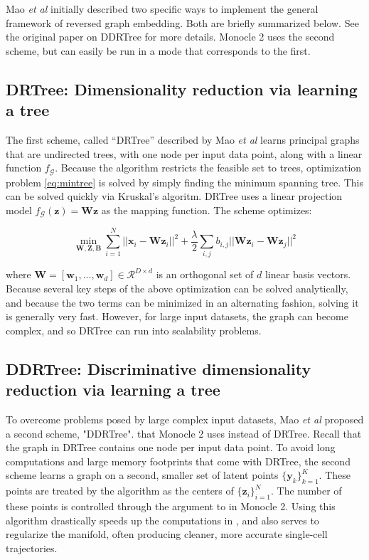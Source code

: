 \documentclass[10pt,oneside]{article}\usepackage[]{graphicx}\usepackage[]{color}
\begin{document}
Mao \emph{et al} initially described two specific ways to implement the general framework
of reversed graph embedding. Both are briefly summarized below. See the original
paper on DDRTree for more details. Monocle 2 uses the second scheme, but can easily be
run in a mode that corresponds to the first.

\subsection{DRTree: Dimensionality reduction via learning a tree}

The first scheme, called ``DRTree'' described by Mao \emph{et al} learns principal graphs that are
undirected trees, with one node per input data point, along with a linear function
$f_\mathcal{G}$. Because the algorithm restricts the feasible set to trees, 
optimization problem \ref{eq:mintree} is solved by simply finding the minimum spanning tree.
This can be solved quickly via Kruskal's algoritm. DRTree uses a 
linear projection model $f_\mathcal{G} (\mathbf{z}) = \mathbf{Wz}$ as 
the mapping function. The scheme optimizes:

\begin{equation}
\mathop{min}_{\mathbf{W}, \mathbf{Z}, \mathbf{B}} \sum_{i = 1}^N ||\mathbf{x}_i  - \mathbf{W}\mathbf{z}_i||^2 + \frac{\lambda}{2} \sum_{i,j}b_{i,j}||\mathbf{W} \mathbf{z}_i - \mathbf{W} \mathbf{z}_j||^2
\end{equation}

where $\mathbf{W} = [\mathbf{w}_1, ..., \mathbf{w}_d] \in
\mathcal{R}^{D \times d}$ is an orthogonal set of $d$ linear basis vectors.
Because several key steps of the above optimization can be solved analytically,
and because the two terms can be minimized in an alternating fashion, 
solving it is generally very fast. However, for large input datasets, the graph
can become complex, and so DRTree can run into scalability problems.

\subsection{DDRTree: Discriminative dimensionality reduction via learning a tree}

To overcome problems posed by large complex input datasets, Mao \emph{et al} 
proposed a second scheme, "DDRTree". that Monocle 2 uses instead of DRTree. Recall that the 
graph in DRTree contains one node per input data point. To avoid long computations and large memory footprints that come with DRTree, the second scheme
learns a graph on a second, smaller set of latent points $\{\mathbf{y}_k\}_{k = 1}^K$. 
These points are treated by the algorithm as the centers of $\{\mathbf{z}_i\}^N_{i = 1}$. 
The number of these points is controlled through the  argument 
to  in Monocle 2. Using this algorithm drastically
speeds up the computations in , and also serves
to regularize the manifold, often producing cleaner, more accurate single-cell
trajectories.
\end{document}
